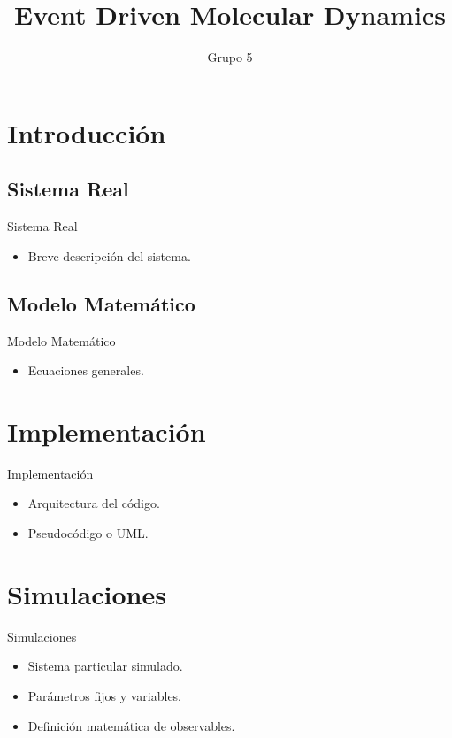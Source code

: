 \documentclass{beamer}
\title{Event Driven Molecular Dynamics}
\author{Grupo 5}
\institute{ITBA}
\date{} %
\begin{document}
\begin{frame}
  \titlepage
\end{frame}

\section{Introducción}

\subsection{Sistema Real}
\begin{frame}{Sistema Real}
  \begin{itemize}
    \item Breve descripción del sistema.
  \end{itemize}
\end{frame}

\subsection{Modelo Matemático}
\begin{frame}{Modelo Matemático}
  \begin{itemize}
    \item Ecuaciones generales.
  \end{itemize}
\end{frame}

\section{Implementación}
\begin{frame}{Implementación}
  \begin{itemize}
    \item Arquitectura del código.
    \item Pseudocódigo o UML.
  \end{itemize}
\end{frame}

\section{Simulaciones}
\begin{frame}{Simulaciones}
  \begin{itemize}
    \item Sistema particular simulado.
    \item Parámetros fijos y variables.
    \item Definición matemática de observables.
  \end{itemize}
\end{frame}
\end{document}
